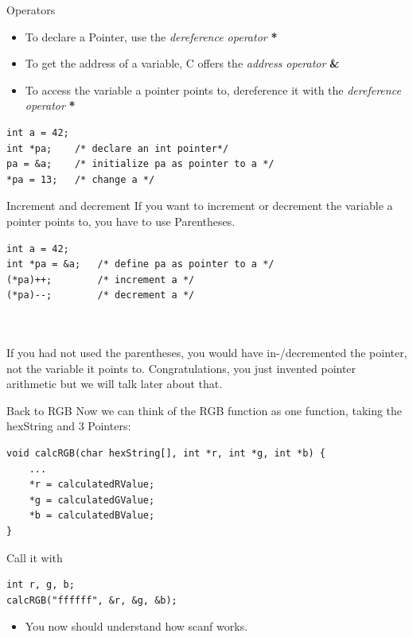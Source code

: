 
\begin{frame}[fragile]{Operators}
	\begin{itemize}
		\item To declare a Pointer, use the \textit{dereference operator} \textbf{*}
		\item To get the address of a variable, C offers the \textit{address operator} \textbf{\&}
		\item To access the variable a pointer points to, dereference it with the \textit{dereference operator} \textbf{*}
	\end{itemize}
	\begin{lstlisting}[numbers=none]
int a = 42;
int *pa;	/* declare an int pointer*/
pa = &a;	/* initialize pa as pointer to a */
*pa = 13;	/* change a */
\end{lstlisting}
\end{frame}


\begin{frame}[fragile]{Increment and decrement}
	If you want to increment or decrement the variable a pointer points to, you have to use Parentheses.
	\begin{lstlisting}[numbers=none]
int a = 42;
int *pa = &a;	/* define pa as pointer to a */
(*pa)++;		/* increment a */
(*pa)--;		/* decrement a */
\end{lstlisting}
\ \\\ \\
If you had not used the parentheses, you would have in-/decremented the pointer, not the variable it points to. 
Congratulations, you just invented pointer arithmetic but we will talk later about that.
\end{frame}


\begin{frame}[fragile]{Back to RGB}
	Now we can think of the RGB function as one function, taking the hexString and 3 Pointers:
	\begin{lstlisting}[numbers=none]
void calcRGB(char hexString[], int *r, int *g, int *b) {
	...
	*r = calculatedRValue;
	*g = calculatedGValue;
	*b = calculatedBValue;
}
\end{lstlisting}
	Call it with
	\begin{lstlisting}[numbers=none]
int r, g, b;
calcRGB("ffffff", &r, &g, &b);
\end{lstlisting}
	\begin{itemize}
		\item You now should understand how scanf works.
	\end{itemize}
\end{frame}

